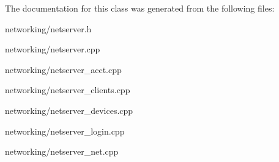 The documentation for this class was generated from the following files\+:\begin{DoxyCompactItemize}
\item 
networking/netserver.\+h\item 
networking/netserver.\+cpp\item 
networking/netserver\+\_\+acct.\+cpp\item 
networking/netserver\+\_\+clients.\+cpp\item 
networking/netserver\+\_\+devices.\+cpp\item 
networking/netserver\+\_\+login.\+cpp\item 
networking/netserver\+\_\+net.\+cpp\end{DoxyCompactItemize}
